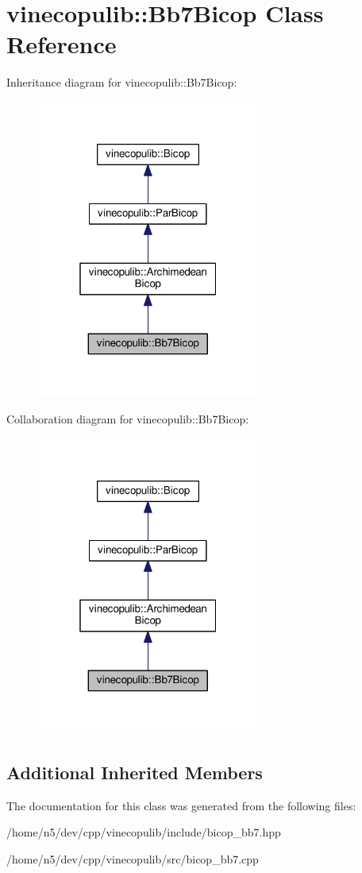 \hypertarget{classvinecopulib_1_1_bb7_bicop}{}\section{vinecopulib\+:\+:Bb7\+Bicop Class Reference}
\label{classvinecopulib_1_1_bb7_bicop}


Inheritance diagram for vinecopulib\+:\+:Bb7\+Bicop\+:\nopagebreak
\begin{figure}[H]
\begin{center}
\leavevmode
\includegraphics[width=208pt]{classvinecopulib_1_1_bb7_bicop__inherit__graph}
\end{center}
\end{figure}


Collaboration diagram for vinecopulib\+:\+:Bb7\+Bicop\+:\nopagebreak
\begin{figure}[H]
\begin{center}
\leavevmode
\includegraphics[width=208pt]{classvinecopulib_1_1_bb7_bicop__coll__graph}
\end{center}
\end{figure}
\subsection*{Additional Inherited Members}


The documentation for this class was generated from the following files\+:\begin{DoxyCompactItemize}
\item 
/home/n5/dev/cpp/vinecopulib/include/bicop\+\_\+bb7.\+hpp\item 
/home/n5/dev/cpp/vinecopulib/src/bicop\+\_\+bb7.\+cpp\end{DoxyCompactItemize}
